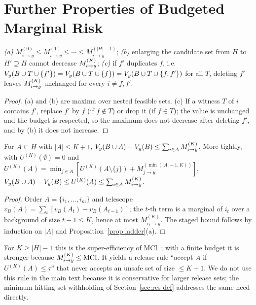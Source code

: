 \section{Further Properties of Budgeted Marginal Risk}\label{app:proofs}

\begin{proposition}\label{prop:ladder}
\emph{(a)} $M^{(0)}_{i\to y}\le M^{(1)}_{i\to y}\le\cdots\le M^{(|H|-1)}_{i\to y}$;
\emph{(b)} enlarging the candidate set from $H$ to $H'\supseteq H$ cannot decrease $M^{(K)}_{i\to y}$;
\emph{(c)} if $f'$ duplicates $f$, i.e.\ $V_y(B\cup T\cup\{f'\})=V_y(B\cup T\cup\{f\})=V_y(B\cup T\cup\{f,f'\})$
for all $T$, deleting $f'$ leaves $M^{(K)}_{i\to y}$ unchanged for every $i\ne f,f'$.
\end{proposition}
\begin{proof}
(a) and (b) are maxima over nested feasible sets. (c) If a witness $T$ of $i$ contains $f'$,
replace $f'$ by $f$ (if $f\notin T$) or drop it (if $f\in T$); the value is unchanged and the budget
is respected, so the maximum does not decrease after deleting $f'$, and by (b) it does not increase.
\end{proof}

\begin{theorem}\label{thm:super}
For $A\subseteq H$ with $|A|\le K+1$, $V_y(B\cup A)-V_y(B)\le\sum_{i\in A}M^{(K)}_{i\to y}$. More tightly, with
$U^{(K)}(\emptyset)=0$ and $U^{(K)}(A)=\min_{j\in A}[U^{(K)}(A\setminus\{j\})+M^{(\min(|A|-1,K))}_{j\to y}]$,
$V_y(B\cup A)-V_y(B)\le U^{(K)}(A)\le\sum_{i\in A}M^{(K)}_{i\to y}$.
\end{theorem}
\begin{proof}
Order $A=\{i_1,\dots,i_m\}$ and telescope $v_B(A)=\sum_t[v_B(A_t)-v_B(A_{t-1})]$; the $t$-th term is a
marginal of $i_t$ over a background of size $t-1\le K$, hence at most $M^{(K)}_{i_t\to y}$. The staged
bound follows by induction on $|A|$ and Proposition~\ref{prop:ladder}(a).
\end{proof}
For $K\ge|H|-1$ this is the super-efficiency of MCI~\cite{catav2021mci}; with a finite budget it is
stronger because $M^{(K)}_{i\to y}\le\mathrm{MCI}$. It yields a release rule ``accept $A$ if $U^{(K)}(A)\le\tau$''
that never accepts an unsafe set of size $\le K+1$. We do not use this rule in the main text because
it is conservative for larger release sets; the minimum-hitting-set withholding of
Section~\ref{sec:res-def} addresses the same need directly.

